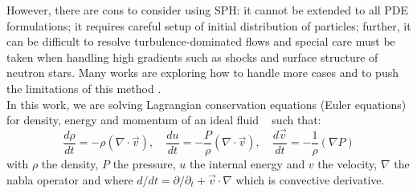 However, there are cons to consider using SPH: 
it cannot be extended to all PDE formulations;
it requires careful setup of initial distribution of particles; 
further, it can be difficult to resolve turbulence-dominated flows and special care must be taken when handling high gradients such as shocks and surface structure of neutron stars.
Many works are exploring how to handle more cases and to push the limitations of this method \cite{dai2017dual,lind2016incompressible,ren2016dual}.\\

In this work, we are solving Lagrangian conservation equations (Euler equations) for density, energy and momentum of an ideal fluid ~\cite{Landau1959} such that:
\begin{equation}
\frac{d \rho}{d t} = - \rho ( \nabla \cdot \vec{v}), \quad
\frac{d u}{d t} = - \frac{P}{\rho} ( \nabla \cdot \vec{v} ), \quad
\frac{d \vec{v}}{d t} = - \frac{1}{\rho} (\nabla P)
\end{equation}
with $\rho$ the density, $P$ the pressure, $u$ the internal energy and $v$ the velocity, $\nabla$ the nabla operator and where $d/dt = \partial/\partial_t + \vec{v} \cdot \nabla$ which is convective derivative.

